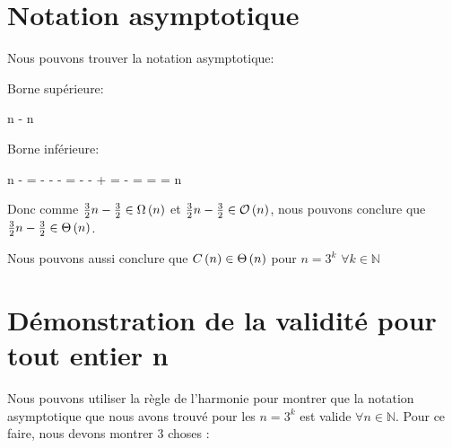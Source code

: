 \documentclass[class=article]{standalone}
\begin{document}
\section*{Notation asymptotique}
Nous pouvons trouver la notation asymptotique:

Borne supérieure:
\begin{deriv}
  n - 
  \<\leq
  n
  \<\in 
  \BigO{}
\end{deriv}

Borne inférieure:
\begin{deriv}
  n - 
  \<=
   - 
  \<\geq
   -  - 
  \<=
   -  -  + 
  \<=
   - 
  \<=
  \<=
  \<=
  n
  \<\in
  \Omega{}
\end{deriv}

Donc comme $\frac{3}{2}n - \frac{3}{2} \in \Omega \left ( n \right )$ et $\frac{3}{2}n - \frac{3}{2} \in \mathcal{O} \left ( n \right )$,
nous pouvons conclure que $\frac{3}{2}n - \frac{3}{2} \in \Theta\left ( n \right )$.

Nous pouvons aussi conclure que $C\left ( n \right ) \in \Theta\left ( n \right )$ pour $n = 3^k$ $\forall k \in \mathbb{N}$

\section*{Démonstration de la validité pour tout entier n}
Nous pouvons utiliser la règle de l'harmonie pour montrer que la notation asymptotique que
nous avons trouvé pour les $n = 3^k$ est valide $\forall n \in \mathbb{N}$. Pour ce faire, nous devons montrer 3 choses :
\end{document}
